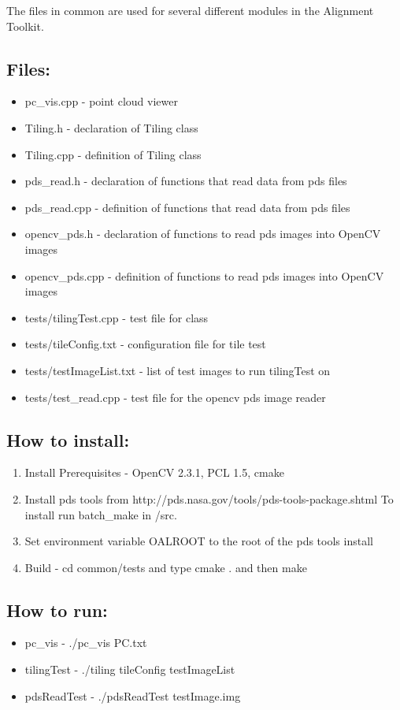 The files in common are used for several different modules in the Alignment Toolkit.

\subsection{Files:}
\begin{itemize}
\item{pc\_vis.cpp} - point cloud viewer
\item{Tiling.h} - declaration of Tiling class
\item{Tiling.cpp} - definition of Tiling class
\item{pds\_read.h} - declaration of functions that read data from pds files
\item{pds\_read.cpp} - definition of functions that read data from pds files
\item{opencv\_pds.h} - declaration of functions to read pds images into OpenCV images
\item{opencv\_pds.cpp} - definition of functions to read pds images into OpenCV images
\item{tests/tilingTest.cpp} - test file for class
\item{tests/tileConfig.txt} - configuration file for tile test
\item{tests/testImageList.txt} - list of test images to run tilingTest on
\item{tests/test\_read.cpp} - test file for the opencv pds image reader

\end{itemize}

\subsection{How to install:}
\begin{enumerate}
	\item{Install Prerequisites} - OpenCV 2.3.1, PCL 1.5, cmake 
   \item{Install} pds tools from http://pds.nasa.gov/tools/pds-tools-package.shtml To install run batch\_make in /src. 
   \item{Set} environment variable OALROOT to the root of the pds tools install
	\item{Build} - cd common/tests and type cmake . and then make
\end{enumerate}

\subsection{How to run:}
\begin{itemize}
	\item{pc\_vis} - ./pc\_vis PC.txt
	\item{tilingTest} - ./tiling tileConfig testImageList
	\item{pdsReadTest} - ./pdsReadTest testImage.img
\end{itemize}
